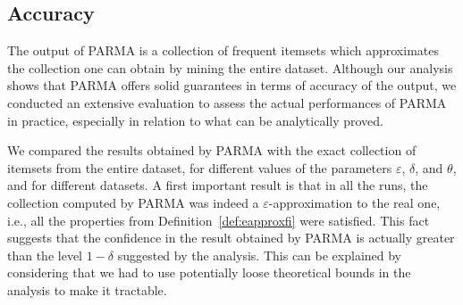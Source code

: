 \subsection{Accuracy}
The output of PARMA is a collection of frequent itemsets which approximates the
collection one can obtain by mining the entire dataset. Although our analysis
shows that PARMA offers solid guarantees in terms of accuracy of the output, we
conducted an extensive evaluation to assess the actual performances of PARMA in
practice, especially in relation to what can be analytically proved.

We compared the results obtained by PARMA with the exact collection of
itemsets from the entire dataset, for different values of the parameters
$\varepsilon$, $\delta$, and $\theta$, and for different datasets. A first important
result is that in all the runs, the collection computed by PARMA was indeed a
$\varepsilon$-approximation to the real one, i.e., all the properties from
Definition~\ref{def:eapproxfi} were satisfied. This fact suggests that the confidence in
the result obtained by PARMA is actually greater than the level $1-\delta$
suggested by the analysis. This can be explained by considering that we had to
use potentially loose theoretical bounds in the analysis to make it tractable. 

